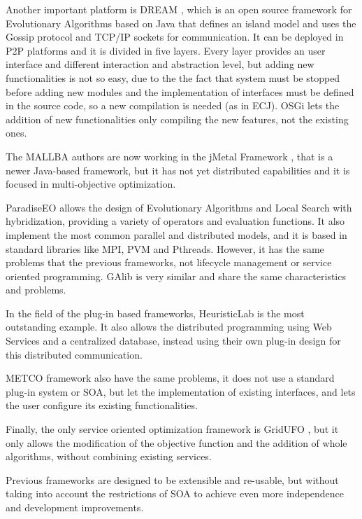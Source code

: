 \documentclass{sig-alternate}
\begin{document}
Another important platform is DREAM \cite{DREAM}, which is an open source framework for Evolutionary Algorithms based on Java that
defines an island model and uses the Gossip protocol and TCP/IP sockets for
communication. It can be deployed in P2P platforms and it is divided
in five layers. Every layer provides an user interface and different
interaction and abstraction level, but adding new functionalities is not so easy, due to the the fact that system must be stopped before adding new modules and the implementation of interfaces must be defined in the source code, so a new compilation is needed (as in ECJ). OSGi lets the addition of new functionalities only compiling the new features, not the existing ones. 

The MALLBA authors are now working in the jMetal Framework \cite{JMETAL}, that is a newer Java-based framework, but it has not yet distributed capabilities and it is focused in multi-objective optimization.

ParadiseEO \cite{PARADISEO} allows the design of Evolutionary Algorithms and Local Search with hybridization, providing a variety of operators and evaluation functions. It also implement the most common parallel and distributed models, and it is based in standard libraries like MPI, PVM and Pthreads. However, it has the same problems that the previous frameworks, not lifecycle management or service oriented programming. GAlib \cite{GALIB} is very similar and share the same characteristics and problems.

In the field of the plug-in based frameworks, HeuristicLab \cite{HEURISTICLAB} is the most outstanding example. It also allows the distributed programming using Web Services and a centralized database, instead using their own plug-in design for this distributed communication.

METCO framework \cite{METCO} also have the same problems, it does not use a standard plug-in system or SOA, but let the implementation of existing interfaces, and lets the user configure its existing functionalities.

Finally, the only service oriented optimization framework is GridUFO \cite{GRIDUFO}, but it only allows the modification of the objective function and the addition of whole algorithms, without combining existing services.

Previous frameworks are designed to be extensible and re-usable, but without taking into account the restrictions of SOA to achieve even more independence and development improvements.
\end{document}
